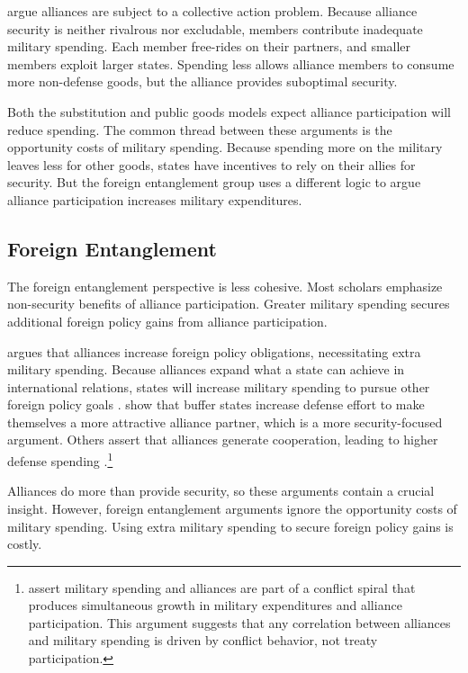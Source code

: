 \documentclass[12pt]{article}
\begin{document}
\citet{OlsonZeckhauser1966} argue alliances are subject to a collective action problem.
Because alliance security is neither rivalrous nor excludable, members contribute inadequate military spending. 
Each member free-rides on their partners, and smaller members exploit larger states. 
Spending less allows alliance members to consume more non-defense goods, but the alliance provides suboptimal security. 


Both the substitution and public goods models expect alliance participation will reduce spending. 
The common thread between these arguments is the opportunity costs of military spending. 
Because spending more on the military leaves less for other goods, states have incentives to rely on their allies for security. 
But the foreign entanglement group uses a different logic to argue alliance participation increases military expenditures. 


\subsection{Foreign Entanglement}


The foreign entanglement perspective is less cohesive.
Most scholars emphasize non-security benefits of alliance participation. 
Greater military spending secures additional foreign policy gains from alliance participation. 


\citet{Diehl1994} argues that alliances increase foreign policy obligations, necessitating extra military spending. 
Because alliances expand what a state can achieve in international relations, states will increase military spending to pursue other foreign policy goals \citep{MorganPalmer2006}. 
\citet{Horowitzetal2017} show that buffer states increase defense effort to make themselves a more attractive alliance partner, which is a more security-focused argument. 
Others assert that alliances generate cooperation, leading to higher defense spending \citep{Palmer1990, QuirozFlores2011}.\footnote{
\citet{SeneseVasquez2008} assert military spending and alliances are part of a conflict spiral that produces simultaneous growth in military expenditures and alliance participation. 
This argument suggests that any correlation between alliances and military spending is driven by conflict behavior, not treaty participation.
}


Alliances do more than provide security, so these arguments contain a crucial insight.
However, foreign entanglement arguments ignore the opportunity costs of military spending. 
Using extra military spending to secure foreign policy gains is costly.
\end{document}
